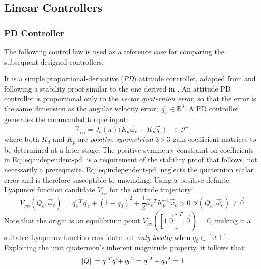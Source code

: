 \subsection{Linear Controllers}
\label{subsec:control.attitude.controllers}
\subsubsection{PD Controller}
\label{subsubsec:control.attitude.controllers.pd}
The following control law is used as a reference case for comparing the subsequent designed controllers.
\par
It is a simple proportional-derivative (\emph{PD}) attitude controller, adapted from \cite{fullquaternion} and following a stability proof similar to the one derived in \cite{attitudecontrolproblem}. An attitude PD controller is proportional only to the \emph{vector quaternion error}, so that the error is the same dimension as the angular velocity error; $\vec{q}_e\in\mathbb{R}^3$. A PD controller generates the commanded torque input:
\begin{equation}\label{eq:independent-pd}
\vec{\tau}_{_{PD}}=J_b(u)\big(K_d\vec{\omega}_e+K_p\vec{q}_e\big)~~~~\in\mathcal{F}^b
\end{equation}
where both $K_d$ and $K_p$ are \emph{positive symmetrical} $3\times 3$ gain coefficient matrices to be determined at a later stage. The positive symmetry constraint on coefficients in Eq:\ref{eq:independent-pd} is a requirement of the stability proof that follows, not necessarily a prerequisite. Eq:\ref{eq:independent-pd} neglects the quaternion scalar error and is therefore susceptible to unwinding. Using a positive-definite Lyapunov function candidate $V_{_{PD}}$ for the attitude trajectory:
\begin{equation}\label{eq:lyapunov-pd}
V_{_{PD}}(Q_e,\vec{\omega}_e)=\vec{q}_e\text{}^T\vec{q}_e+(1-q_0)^2+\frac{1}{2}\vec{\omega}_e\text{}^TK_p^{-1}\vec{\omega}_e>0~~\forall(Q_e,\vec{\omega}_e)\not = \vec{0}
\end{equation}
Note that the origin is an equilibrium point $V_{_{PD}}([1~\vec{0}\hspace{1pt}]^T,\vec{0}\hspace{1pt})=0$, making it a suitable Lyapunov function candidate but \emph{only locally} when $q_0\in[0:1]$. Exploiting the unit quaternion's inherent magnitude property, it follows that:
\begin{equation}\label{eq:4.171}
\left\lVert Q\right\rVert=\vec{q}\text{}^{\hspace{3pt}T}\vec{q}+q_0\text{}^2=\vec{q}\text{}^{\hspace{3pt}2}+q_0\text{}^2=1
\end{equation}
